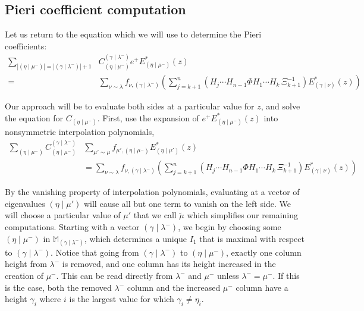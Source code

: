 \documentclass[ALCO]{cedram}
\newcommand{\ep}{e^+}
\newcommand{\Estar}[1]{E^*_{#1}}
\newcommand{\MM}{\mathbb{M}_{\gammalambdamin}}
\newcommand{\gammalambdamin}{{(\gamma \mid \lambda^-)}}
\newcommand{\gammanu}{{(\gamma \mid \nu)}}
\newcommand{\etamu}{{(\eta \mid \mu^-)}}
\newcommand{\etamuprime}{{(\eta \mid \mu')}}
\newcommand{\mutilde}{{\widetilde{\mu}}}
\newcommand{\fnu}{f_{\nu, \gammalambdamin}}
\newcommand{\gmuprime}{f_{\mu',\etamu}}
\begin{document}
    \subsection{Pieri coefficient computation}\label{Piericomputation}
Let us return to the equation which we will use to determine the Pieri coefficients:
\begin{align}\label{evaluatethis}\sum_{|\etamu| = |\gammalambdamin| + 1} &C^{\gammalambdamin}_{\etamu} \ep \Estar{\etamu}(z)\nonumber \\ = &\sum_{\nu \sim \lambda} \fnu \left( \sum_{j=k+1}^n \left( H_j \dotsm H_{n-1} \Phi H_1 \dotsm H_{k} \, \Xi_{k+1}^{-1} \right)  \Estar{\gammanu}(z)\right)\end{align}

Our approach will be to evaluate both sides at a particular value for $z$, and solve the equation for $C_{\etamu}$. First, use the expansion of $\ep \Estar{\etamu}(z)$ into nonsymmetric interpolation polynomials,
\begin{align}\label{evaluationpoint}\sum_{\etamu}  C^{\gammalambdamin}_{\etamu} &\sum_{\mu' \sim \mu} \gmuprime \Estar{\etamuprime}(z)\nonumber\\
&= \sum_{\nu \sim \lambda} \fnu \left( \sum_{j=k+1}^n \left( H_j \dotsm H_{n-1} \Phi H_1 \dotsm H_{k} \, \Xi_{k+1}^{-1} \right)  \Estar{\gammanu}(z)\right)\end{align}

By the vanishing property of interpolation polynomials, evaluating at a vector of eigenvalues $\overline{\etamuprime}$ will cause all but one term to vanish on the left side. We will choose a particular value of $\mu'$ that we call $\mutilde$ which simplifies our remaining computations. Starting with a vector $\gammalambdamin$, we begin by choosing some $\etamu$ in $\MM$, which determines a unique $I_1$ that is maximal with respect to $\gammalambdamin$. Notice that going from $\gammalambdamin$ to $\etamu$, exactly one column height from $\lambda^-$ is removed, and one column has its height increased in the creation of $\mu^-$. This can be read directly from $\lambda^-$ and $\mu^-$ unless $\lambda^-=\mu^-$. If this is the case, both the removed $\lambda^-$ column and the increased $\mu^-$ column have a height $\gamma_i$ where $i$ is the largest value for which $\gamma_i \neq \eta_i$.
\end{document}
